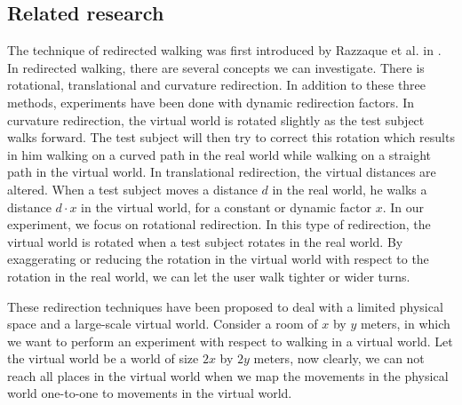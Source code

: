 \subsection{Related  research}
The technique of redirected walking was first introduced by Razzaque et al. in \cite{razzaque}. 
In redirected walking, there are several concepts we can investigate.
There is rotational, translational and curvature redirection.
In addition to these three methods, experiments have been done with dynamic redirection factors.\cite{neth}
In curvature redirection, the virtual world is rotated slightly as the test subject walks forward.
The test subject will then try to correct this rotation which results in him walking on a curved path in the real world while walking on a straight path in the virtual world.
In translational redirection, the virtual distances are altered.
When a test subject moves a distance $d$ in the real world, he walks a distance $d\cdot x$ in the virtual world, for a constant or dynamic factor $x$.
In our experiment, we focus on rotational redirection.
In this type of redirection, the virtual world is rotated when a test subject rotates in the real world.
By exaggerating or reducing the rotation in the virtual world with respect to the rotation in the real world, we can let the user walk tighter or wider turns.

These redirection techniques have been proposed to deal with a limited physical space and a large-scale virtual world.
Consider a room of $x$ by $y$ meters, in which we want to perform an experiment with respect to walking in a virtual world. 
Let the virtual world be a world of size $2x$ by $2y$ meters, now clearly, we can not reach all places in the virtual world when we map the movements in the physical world one-to-one to movements in the virtual world.

